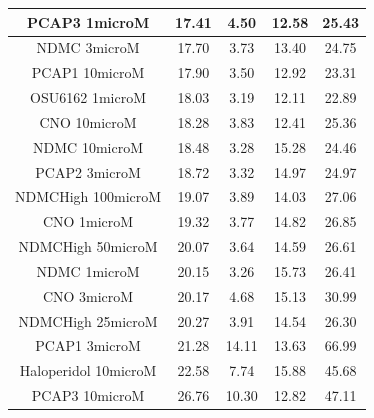 \documentclass[a4paper,12pt]{article}
\begin{document}
\begin{table}[h!]
\begin{tabular}{|c|c|c|c|c|}
PCAP3 1microM       & 17.41 & 4.50   & 12.58 & 25.43 \\ \hline
NDMC 3microM          & 17.70  & 3.73  & 13.40  & 24.75 \\ \hline
PCAP1 10microM        & 17.90  & 3.50   & 12.92 & 23.31 \\ \hline
OSU6162 1microM       & 18.03 & 3.19  & 12.11 & 22.89 \\ \hline
CNO 10microM          & 18.28 & 3.83  & 12.41 & 25.36 \\ \hline
NDMC 10microM         & 18.48 & 3.28  & 15.28 & 24.46 \\ \hline
PCAP2 3microM         & 18.72 & 3.32  & 14.97 & 24.97 \\ \hline
NDMCHigh 100microM    & 19.07 & 3.89  & 14.03 & 27.06 \\ \hline
CNO 1microM           & 19.32 & 3.77  & 14.82 & 26.85 \\ \hline
NDMCHigh 50microM     & 20.07 & 3.64  & 14.59 & 26.61 \\ \hline
NDMC 1microM          & 20.15 & 3.26  & 15.73 & 26.41 \\ \hline
CNO 3microM           & 20.17 & 4.68  & 15.13 & 30.99 \\ \hline
NDMCHigh 25microM     & 20.27 & 3.91  & 14.54 & 26.30  \\ \hline
PCAP1 3microM         & 21.28 & 14.11 & 13.63 & 66.99 \\ \hline
Haloperidol 10microM  & 22.58 & 7.74  & 15.88 & 45.68 \\ \hline
PCAP3 10microM      & 26.76 & 10.30  & 12.82 & 47.11 \\ \hline
\end{tabular}
\end{table}
\newpage
\end{document}
